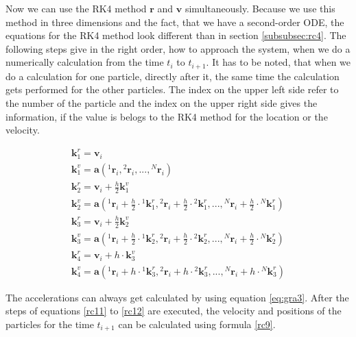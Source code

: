 \documentclass[10pt,a4paper]{article}
\begin{document}
Now we can use the RK4 method $\mathbf{r}$ and $\mathbf{v}$ simultaneously. Because we use this method in three dimensions and the fact, that we have a second-order ODE, the equations for the RK4 method look different than in section \ref{subsubsec:rc4}. The following steps give in the right order, how to approach the system, when we do a numerically calculation from the time $t_i$ to $t_{i+1}$. It has to be noted, that when we do a calculation for one particle, directly after it, the same time the calculation gets performed for the other particles. The index on the upper left side refer to the number of the particle and the index on the upper right side gives the information, if the value is belogs to the RK4 method for the location or the velocity.

\begin{align}
\label{rc11}
\mathbf{k}_1^r = \mathbf{v}_i \\
\mathbf{k}_{1}^{v} = \mathbf{a}({}^{1}\mathbf{r}_i, {}^{2}\mathbf{r}_i,..., {}^{N}\mathbf{r}_i) \\
\mathbf{k}_2^r = \mathbf{v}_i + \frac{h}{2} \mathbf{k}_1^{v}	\\
\mathbf{k}_2^{v} = \mathbf{a}({}^{1}\mathbf{r}_i + \frac{h}{2}\cdot {}^{1}\mathbf{k}_1^r, {}^{2}\mathbf{r}_i + \frac{h}{2}\cdot {}^{2}\mathbf{k}_1^r,..., {}^{N}\mathbf{r}_i + \frac{h}{2}\cdot {}^{N}\mathbf{k}_1^r)	\\
\mathbf{k}_3^r = \mathbf{v}_i + \frac{h}{2} \mathbf{k}_2^v	\\
\mathbf{k}_3^{v} = \mathbf{a}({}^{1}\mathbf{r}_i + \frac{h}{2}\cdot {}^{1}\mathbf{k}_2^r, {}^{2}\mathbf{r}_i + \frac{h}{2}\cdot {}^{2}\mathbf{k}_2^r,..., {}^{N}\mathbf{r}_i + \frac{h}{2}\cdot {}^{N}\mathbf{k}_2^r)	\\
\mathbf{k}_4^r = \mathbf{v}_i + h \cdot \mathbf{k}_3^v	\\
\label{rc12}
\mathbf{k}_4^{v} = \mathbf{a}({}^{1}\mathbf{r}_i + h\cdot {}^{1}\mathbf{k}_3^r, {}^{2}\mathbf{r}_i + h\cdot {}^{2}\mathbf{k}_3^r,..., {}^{N}\mathbf{r}_i + h\cdot {}^{N}\mathbf{k}_3^r)
\end{align}

The accelerations can always get calculated by using equation \eqref{eq:gra3}. After the steps of equations \eqref{rc11} to \eqref{rc12} are executed, the velocity and positions of the particles for the time $t_{i+1}$ can be calculated using formula \eqref{rc9}.
\end{document}

